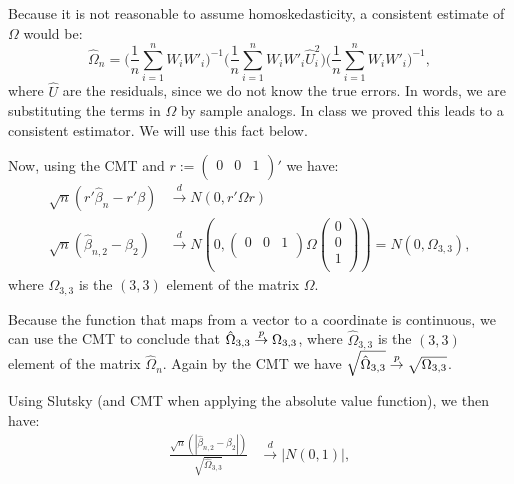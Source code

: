 \documentclass[12pt]{paper}
\begin{document}
Because it is not reasonable to assume homoskedasticity, a consistent estimate of $\Omega$ would be:
\begin{equation}
\hat{\Omega}_n=\Big(\frac{1}{n}\sum_{i=1}^{n}{W_iW'_i}\Big)^{-1}\Big(\frac{1}{n}\sum_{i=1}^{n}{W_iW'_i\hat{U}^2_i}\Big)\Big(\frac{1}{n}\sum_{i=1}^{n}{W_iW'_i}\Big)^{-1},
\end{equation}
\noindent where $\hat{U}$ are the residuals, since we do not know the true errors. In words, we are substituting the terms in $\Omega$ by sample analogs. In class we proved this leads to a consistent estimator. We will use this fact below.

Now, using the CMT and $r:=\begin{pmatrix}
0&0&1\\
\end{pmatrix}'$ we have:
\begin{equation}
\begin{split}
\sqrt{n}(r'\hat{\beta}_{n}-r'\beta)&\overset{d}{\to}N(0,r'\Omega r)\\
\sqrt{n}(\hat{\beta}_{n,2}-\beta_2)&\overset{d}{\to}N(0,\begin{pmatrix}
0&0&1\\
\end{pmatrix}
\Omega\begin{pmatrix}
0\\
0\\
1\\
\end{pmatrix})=N(0,\Omega_{3,3}),
\end{split}
\end{equation}
\noindent where $\Omega_{3,3}$ is the $(3,3)$ element of the matrix $\Omega$.

Because the function that maps from a vector to a coordinate is continuous, we can use the CMT to conclude that $\hat{\Omega}_{3,3}\overset{p}{\to}\Omega_{3,3}$, where $\hat{\Omega}_{3,3}$ is the $(3,3)$ element of the matrix $\hat{\Omega}_n$. Again by the CMT we have $\sqrt{\hat{\Omega}_{3,3}}\overset{p}{\to}\sqrt{\Omega_{3,3}}$.

Using Slutsky (and CMT when applying the absolute value function), we then have:
\begin{equation}
\begin{split}
\frac{\sqrt{n}(|\hat{\beta}_{n,2}-\beta_2|)}{\sqrt{\hat{\Omega}_{3,3}}}&\overset{d}{\to}|N(0,1)|,
\end{split}
\end{equation}
\end{document}
